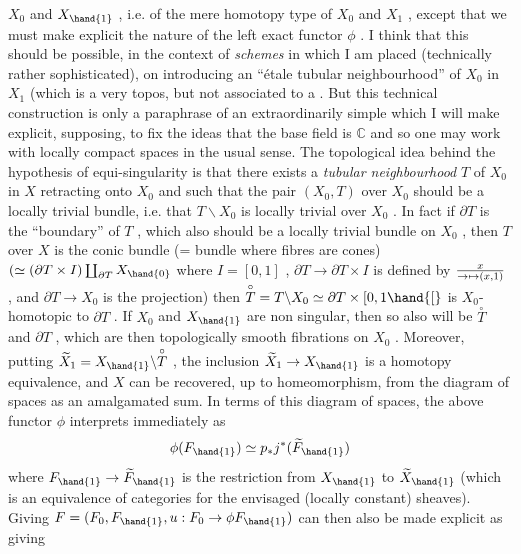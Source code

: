 
$X_0$ and $X_{\hand{1}}$ , i.e. of the mere homotopy type of $X_0$ and $X_1$ , except 
 that we must make explicit the nature of the left exact functor $\phi$ .
I think that this should be possible, in the context of \emph{schemes} in which I
am placed (technically rather sophisticated), on introducing an ``\'etale
tubular neighbourhood'' of $X_0$ in $X_1$ (which is a very  topos, but
not associated to a \hand{)}. But this technical construction is only a
paraphrase of an  extraordinarily simple\hand{,} which I will
make explicit, supposing, to fix the ideas\hand{,} that the base field is $\mathbb{C}$ and so
one may work with locally compact spaces in the usual sense. The topological
idea behind the hypothesis of equi-singularity is that there exists a
\emph{tubular neighbourhood} $T$ of $X_0$ in $X$ retracting onto $X_0$ and such
that the pair $(X_0 , T)$ over $X_0$ should be a locally trivial bundle, i.e.
that $T\backslash X_0$ is locally trivial over $X_0$ . In fact if $\partial T$ is the ``boundary''
of $T$ , which also should be a locally trivial bundle on $X_0$ , then $T$ over
$X$ is the conic bundle (= bundle where fibres are cones) $(\simeq (\partial T \times I) \coprod_{\partial T} X_{\hand{0}}$
\margin{$\longmapsto$} where $I = [0, 1]$ , $\partial T \to \partial T \times I$ is defined by $x \over{\to}{\mapsto} (x, 1)$ , and
$\partial T \to X_0$ is the projection) then $\overset{\circ}{T} = T\backslash X_0 \simeq \partial T \times [0, 1\hand{[}$ is $X_0$-homotopic
to $\partial T$ . If $X_0$ and $X_{\hand{1}}$ are non singular, then so also will be $\overset{\circ}{T}$ and $\partial T$ ,
which are then topologically smooth fibrations on $X_0$ . Moreover, putting
$\widetilde{X}_1 = X_{\hand{1}}\backslash\overset{\circ}{T}$ , the inclusion $\widetilde{X}_1 \to X_{\hand{1}}$ is a homotopy equivalence, and $X$ can
be recovered, up to homeomorphism, from the diagram of spaces
as an amalgamated sum. In terms of this diagram of spaces, the above functor
$\phi$ interprets immediately as
\[ \phi(F_{\hand{1}}) \simeq p_* j^*(\widetilde{F}_{\hand{1}}) \]
where $F_{\hand{1}} \to \widetilde{F}_{\hand{1}}$ is the restriction from $X_{\hand{1}}$ to $\widetilde{X}_{\hand{1}}$ (which is an equivalence
of categories for the envisaged (locally constant) sheaves). Giving
$F = (F_0 , F_{\hand{1}} , u : F_0 \to \phi F_{\hand{1}})$ can then also be made explicit as giving

